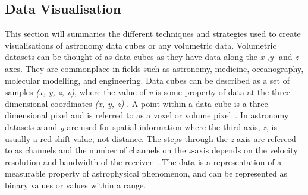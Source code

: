 \subsection{Data Visualisation}
\label{sec:data-visualisation}
This section will summaries the different techniques and strategies used to create visualisations of astronomy data cubes or any volumetric data. 
Volumetric datasets can be thought of as data cubes as they have data along the \textit{x}-,\textit{y}- and \textit{z}-axes. 
They are commonplace in fields such as astronomy, medicine, oceanography, molecular modelling, and engineering.
Data cubes can be described as a set of samples \textit{(x, y, z, v)}, where the value of \textit{v} is some property of data at the three-dimensional coordinates \textit{(x, y, z)} \cite{Kaufman2000}.
A point within a data cube is a three-dimensional pixel and is referred to as a voxel or volume pixel~\cite{Kaufman1996}.
In astronomy datasets \textit{x} and \textit{y} are used for spatial information where the third axis, \textit{z}, is usually a red-shift value, not distance.
The steps through the \textit{z}-axis are refereed to as channels and the number of channels on the \textit{z}-axis depends on the velocity resolution and bandwidth of the receiver~\cite{Taylor2015}.
The data is a representation of a measurable property of astrophysical phenomenon, and can be represented as binary values or values within a range.

